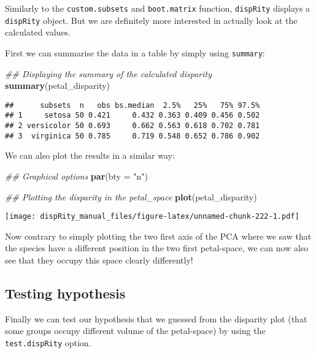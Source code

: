 \documentclass[
]{book}
\newenvironment{Shaded}{\begin{snugshade}}{\end{snugshade}}
\newcommand{\CommentTok}[1]{\textcolor[rgb]{0.56,0.35,0.01}{\textit{#1}}}
\newcommand{\DataTypeTok}[1]{\textcolor[rgb]{0.13,0.29,0.53}{#1}}
\newcommand{\KeywordTok}[1]{\textcolor[rgb]{0.13,0.29,0.53}{\textbf{#1}}}
\newcommand{\NormalTok}[1]{#1}
\newcommand{\StringTok}[1]{\textcolor[rgb]{0.31,0.60,0.02}{#1}}
\begin{document}
Similarly to the \texttt{custom.subsets} and \texttt{boot.matrix} function, \texttt{dispRity} displays a \texttt{dispRity} object.
But we are definitely more interested in actually look at the calculated values.

First we can summarise the data in a table by simply using \texttt{summary}:

\begin{Shaded}
\begin{Highlighting}[]
\CommentTok{\#\# Displaying the summary of the calculated disparity}
\KeywordTok{summary}\NormalTok{(petal\_disparity)}
\end{Highlighting}
\end{Shaded}

\begin{verbatim}
##      subsets  n   obs bs.median  2.5%   25%   75% 97.5%
## 1     setosa 50 0.421     0.432 0.363 0.409 0.456 0.502
## 2 versicolor 50 0.693     0.662 0.563 0.618 0.702 0.781
## 3  virginica 50 0.785     0.719 0.548 0.652 0.786 0.902
\end{verbatim}

We can also plot the results in a similar way:

\begin{Shaded}
\begin{Highlighting}[]
\CommentTok{\#\# Graphical options}
\KeywordTok{par}\NormalTok{(}\DataTypeTok{bty =} \StringTok{"n"}\NormalTok{)}

\CommentTok{\#\# Plotting the disparity in the petal\_space}
\KeywordTok{plot}\NormalTok{(petal\_disparity)}
\end{Highlighting}
\end{Shaded}

\texttt{[image: dispRity\_manual\_files/figure-latex/unnamed-chunk-222-1.pdf]}

Now contrary to simply plotting the two first axis of the PCA where we saw that the species have a different position in the two first petal-space, we can now also see that they occupy this space clearly differently!

\hypertarget{testing-hypothesis}{%
\subsection{Testing hypothesis}\label{testing-hypothesis}}

Finally we can test our hypothesis that we guessed from the disparity plot (that some groups occupy different volume of the petal-space) by using the \texttt{test.dispRity} option.
\end{document}
